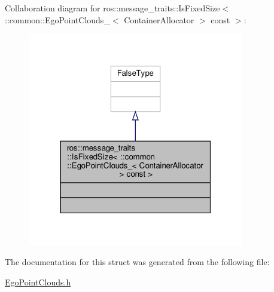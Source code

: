 Collaboration diagram for ros\+:\+:message\+\_\+traits\+:\+:Is\+Fixed\+Size$<$ \+:\+:common\+:\+:Ego\+Point\+Clouds\+\_\+$<$ Container\+Allocator $>$ const $>$\+:\nopagebreak
\begin{figure}[H]
\begin{center}
\leavevmode
\includegraphics[width=268pt]{d9/d36/structros_1_1message__traits_1_1IsFixedSize_3_01_1_1common_1_1EgoPointClouds___3_01ContainerAllobee1b8bdd2468eccf464dca5f87daa58}
\end{center}
\end{figure}


The documentation for this struct was generated from the following file\+:\begin{DoxyCompactItemize}
\item 
\hyperlink{EgoPointClouds_8h}{Ego\+Point\+Clouds.\+h}\end{DoxyCompactItemize}
